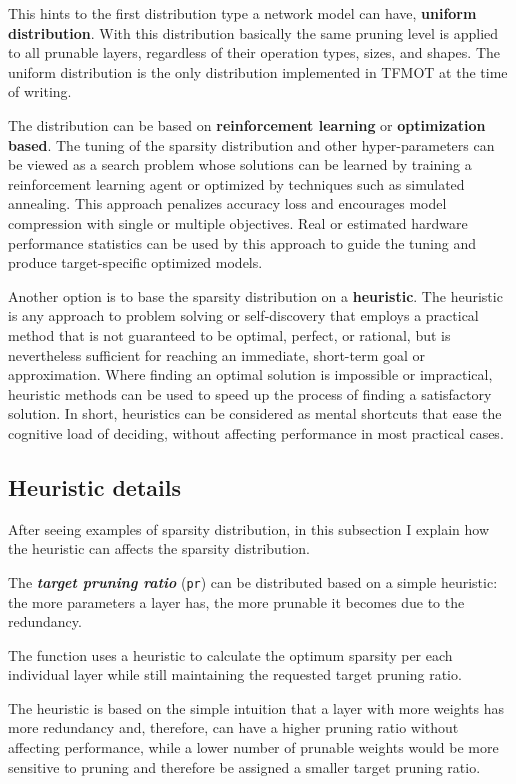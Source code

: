 This hints to the first distribution type a network model can have,
\textbf{uniform distribution}. With this distribution basically the same
pruning level is applied to all prunable layers, regardless of their operation
types, sizes, and shapes.
The uniform distribution is the only distribution implemented in TFMOT at the
time of writing.

The distribution can be based on \textbf{reinforcement learning} or
\textbf{optimization based}. The tuning of the sparsity distribution and other
hyper-parameters can be viewed as a search problem whose solutions can be
learned\cite{He_2018} by training a reinforcement learning agent or optimized
by techniques such as simulated annealing. This approach penalizes accuracy
loss and encourages model compression with single or multiple objectives.
Real or estimated hardware performance statistics can be used by this approach
to guide the tuning and produce target-specific optimized models.

Another option is to base the sparsity distribution on a \textbf{heuristic}.
The heuristic is any approach to problem solving or self-discovery that employs
a practical method that is not guaranteed to be optimal, perfect, or rational,
but is nevertheless sufficient for reaching an immediate, short-term goal or
approximation.
Where finding an optimal solution is impossible or impractical, heuristic
methods can be used to speed up the process of finding a satisfactory solution.
In short, heuristics can be considered as mental shortcuts that ease the
cognitive load of deciding, without affecting performance in most practical
cases.\cite{heuristic}

\subsection{Heuristic details}
After seeing examples of sparsity distribution, in this subsection I explain
how the heuristic can affects the sparsity distribution.

The \textbf{\textit{target pruning ratio}} (\texttt{pr}) can be distributed
based on a simple heuristic: the more parameters a layer has, the more prunable
it becomes due to the redundancy.

The function uses a heuristic to calculate the optimum sparsity per each
individual layer while still maintaining the requested target pruning ratio.

The heuristic is based on the simple intuition that a layer with more weights
has more redundancy and, therefore, can have a higher pruning ratio without
affecting performance, while a lower number of prunable weights would be more
sensitive to pruning and therefore be assigned a smaller target pruning ratio.

